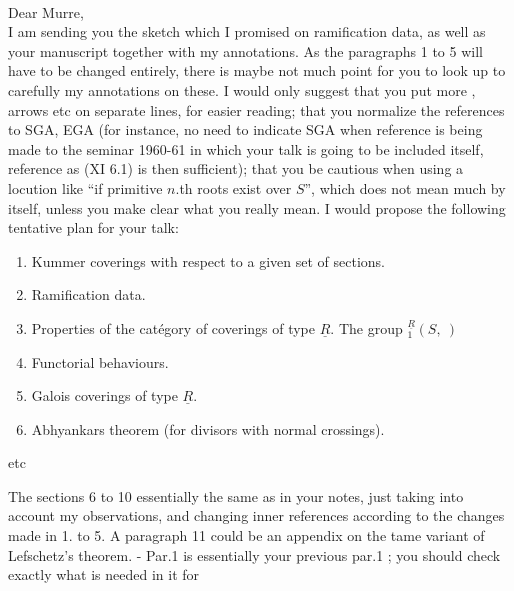 \\

Dear Murre,\\

I am sending you  the sketch which I promised on ramification data, as well as your manuscript together with my annotations. As the paragraphs 1 to 5 will have to be changed entirely, there is maybe not much point for you to look up to carefully my annotations on these.  I would only suggest that you put more , arrows etc on  separate lines, for easier reading; that you normalize the  references to SGA, EGA (for instance, no need to indicate SGA when reference is being made to the seminar 1960-61 in which your talk is going to be included itself, reference as (XI 6.1) is then sufficient); that you be cautious when using a locution like ``if primitive $n$.th roots exist over $S$'', which does not mean much by itself, unless you make clear what you really mean. I would propose the following tentative plan for your talk:

\begin{enumerate}[label={}]
\item[1.] Kummer coverings with respect to a given set of sections.
\item[2.] Ramification data.
\item[3.] Properties of the catégory of coverings of type $\underline{R}$. The group ${}_{1}^{\underline{R}}(S,\ )$
\item[4.] Functorial behaviours.
\item[5.] Galois coverings of type $\underline{R}$.
\item[6.] Abhyankars theorem (for divisors with normal crossings).
\end{enumerate}
etc

The sections 6 to 10 essentially the same as in your notes, just taking into account my observations, and changing inner references according to the changes made in 1. to 5. A paragraph 11 could be an appendix on the tame variant of Lefschetz's theorem. - Par.1 is essentially your previous par.1 ; you should check exactly what is needed in it for 

